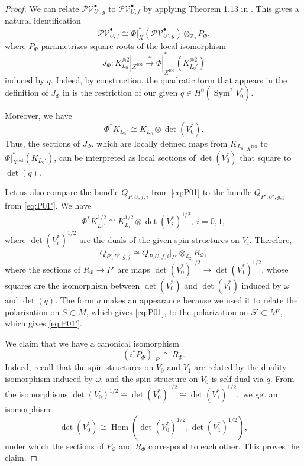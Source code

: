 \documentclass [11pt]{amsart}
\theoremstyle{remark}
\def\zz {{\mathbb{Z}}}
\def\Z {\zz}
\def\Sym{{\operatorname{Sym}}}
\def\Hom {\operatorname{Hom}}
\def\PVb {\mathcal{PV}^\bullet}
\def\red {\operatorname{red}}
\begin{document}
\begin{proof}
We can relate $\PVb_{U', g}$ to $\PVb_{U, f}$ by applying Theorem 1.13 in \cite{Bussi}. This gives a natural identification
\begin{equation}
\label{eq:PUU}
 \PVb_{U, f} \cong \Phi|_X^*(\PVb_{U', g})  \otimes_{\Z_2} P_{\Phi}.
\end{equation}
where $P_{\Phi}$ parametrizes square roots of the local isomorphism 
$$ J_{\Phi}: K_{L_0}^{\otimes 2}|_{X^{\red}} \xrightarrow{\cong} \Phi|^*_{X^{\red}} (K_{L_0'}^{\otimes 2})$$
induced by $q$. Indeed, by construction, the quadratic form that appears in the definition of $J_{\Phi}$ in \cite[Definition 1.11]{Bussi} is the restriction of our given $q \in H^0(\Sym^2 V_0^*)$. 

Moreover, we have
$$ \Phi^* K_{L_0'} \cong K_{L_0} \otimes \det(V^*_0).$$
Thus, the sections of $J_{\Phi}$, which are locally defined maps from $K_{L_0}|_{X^{\red}}$ to $ \Phi|^*_{X^{\red}} (K_{L_0'})$, can be interpreted as local sections of $ \det(V_0^*)$ that square to $\det(q)$. 

Let us also compare the bundle $Q_{P, U, f, i}$ from \eqref{eq:P01} to the bundle $Q_{P', U', g, j}$ from \eqref{eq:P01'}. We have
$$\Phi^* K_{L_i'}^{1/2} \cong K_{L_i}^{1/2} \otimes \det(V^*_i)^{1/2}, \ i=0,1,$$
where $\det(V^*_i)^{1/2}$ are the duals of the given spin structures on $V_i$. Therefore, 
\begin{equation}
\label{eq:RPhi}
  Q_{P', U', g, j} \cong  Q_{P, U, f, i}|_{P'} \otimes_{\Z_2}  R_{\Phi},
\end{equation}
where the sections of $R_{\Phi} \to P'$ are maps $ \det(V^*_0)^{1/2} \to \det(V^*_1)^{1/2}$, whose squares are the isomorphism between $ \det(V^*_0)$ and $\det(V^*_1)$ induced by $\omega$ and $\det(q)$. The form $q$ makes an appearance because we used it to relate the polarization on $S \subset M$, which gives \eqref{eq:P01}, to the polarization on $S' \subset M'$, which gives \eqref{eq:P01'}.

We claim that we have a canonical isomorphism
\begin{equation}
\label{eq:PR}
(i^* P_{\Phi})|_{P'} \cong R_{\Phi}.
\end{equation} Indeed, recall that the spin structures on $V_0$ and $V_1$ are related by the duality isomorphism induced by $\omega$, and the spin structure on $V_0$ is self-dual via $q$. From the isomorphisms $\det(V_0)^{1/2} \cong \det(V_0^*)^{1/2} \cong  \det(V^*_1)^{1/2},$ we get an isomorphism
$$  \det(V^*_0) \cong \Hom( \det(V^*_0)^{1/2}, \det(V^*_1)^{1/2}),$$
under which the sections of $P_{\Phi}$ and $R_{\Phi}$ correspond to each other. This proves the claim.


\end{proof}
\end{document}
